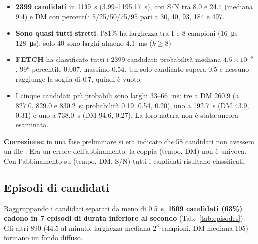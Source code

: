 \documentclass[11pt,a4paper]{article}
\DeclareRobustCommand{\file}[1]{\texttt{\detokenize{#1}}}
\begin{document}
\begin{itemize}
  \item \textbf{2399 candidati} in \SI{1199}{\second} (\SI{3.99}{}--\SI{1195.17}{\second}), con S/N tra 8.0 e 24.4
    (mediana 9.4) e DM con percentili 5/25/50/75/95 pari a 30, 40, 93, 184 e 497.
  \item \textbf{Sono quasi tutti stretti}: l'81\% ha larghezza tra 1 e 8 campioni
    (\SIrange{16}{128}{\micro\second}); solo 40 sono larghi almeno \SI{4.1}{\milli\second} ($k\geq8$).
  \item \textbf{FETCH} ha classificato tutti i 2399 candidati: probabilità mediana $4.5\times10^{-8}$, 99° percentile
    0.007, massimo 0.54. Un solo candidato supera 0.5 e nessuno raggiunge la soglia di 0.7, quindi
    \file{Best_candidates.csv} è vuoto.
  \item I cinque candidati più probabili sono larghi 33--\SI{66}{\milli\second}: tre a DM 260.9 (a 827.0, 829.0 e
    \SI{830.2}{\second}; probabilità 0.19, 0.54, 0.20), uno a \SI{192.7}{\second} (DM 43.9, 0.31) e uno a
    \SI{738.0}{\second} (DM 94.6, 0.27). La loro natura non è stata ancora esaminata.
\end{itemize}
\textbf{Correzione:} in una fase preliminare si era indicato che 58 candidati non avessero un file \file{.h5}.
Era un errore dell'abbinamento: la coppia (tempo, DM) non è univoca. Con l'abbinamento su (tempo, DM, S/N) tutti
i candidati risultano classificati.

\FloatBarrier
\subsection{Episodi di candidati}
\label{sec:episodes}

Raggruppando i candidati separati da meno di \SI{0.5}{\second}, \textbf{1509 candidati (63\%) cadono in 7 episodi
di durata inferiore al secondo} (Tab.~\ref{tab:episodes}). Gli altri 890 (44.5 al minuto, larghezza mediana
$2^3$ campioni, DM mediana 105) formano un fondo diffuso.
\end{document}
